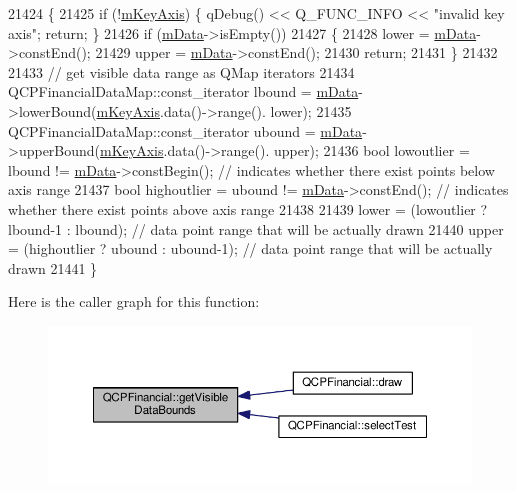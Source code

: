 \begin{DoxyCode}
21424 \{
21425   \textcolor{keywordflow}{if} (!\hyperlink{class_q_c_p_abstract_plottable_a426f42e254d0f8ce5436a868c61a6827}{mKeyAxis}) \{ qDebug() << Q\_FUNC\_INFO << \textcolor{stringliteral}{"invalid key axis"}; \textcolor{keywordflow}{return}; \}
21426   \textcolor{keywordflow}{if} (\hyperlink{class_q_c_p_financial_a475f63587ca1077d8c30aaf2b71ae026}{mData}->isEmpty())
21427   \{
21428     lower = \hyperlink{class_q_c_p_financial_a475f63587ca1077d8c30aaf2b71ae026}{mData}->constEnd();
21429     upper = \hyperlink{class_q_c_p_financial_a475f63587ca1077d8c30aaf2b71ae026}{mData}->constEnd();
21430     \textcolor{keywordflow}{return};
21431   \}
21432   
21433   \textcolor{comment}{// get visible data range as QMap iterators}
21434   QCPFinancialDataMap::const\_iterator lbound = \hyperlink{class_q_c_p_financial_a475f63587ca1077d8c30aaf2b71ae026}{mData}->lowerBound(\hyperlink{class_q_c_p_abstract_plottable_a426f42e254d0f8ce5436a868c61a6827}{mKeyAxis}.data()->range().
      lower);
21435   QCPFinancialDataMap::const\_iterator ubound = \hyperlink{class_q_c_p_financial_a475f63587ca1077d8c30aaf2b71ae026}{mData}->upperBound(\hyperlink{class_q_c_p_abstract_plottable_a426f42e254d0f8ce5436a868c61a6827}{mKeyAxis}.data()->range().
      upper);
21436   \textcolor{keywordtype}{bool} lowoutlier = lbound != \hyperlink{class_q_c_p_financial_a475f63587ca1077d8c30aaf2b71ae026}{mData}->constBegin(); \textcolor{comment}{// indicates whether there exist points below axis
       range}
21437   \textcolor{keywordtype}{bool} highoutlier = ubound != \hyperlink{class_q_c_p_financial_a475f63587ca1077d8c30aaf2b71ae026}{mData}->constEnd(); \textcolor{comment}{// indicates whether there exist points above axis
       range}
21438   
21439   lower = (lowoutlier ? lbound-1 : lbound); \textcolor{comment}{// data point range that will be actually drawn}
21440   upper = (highoutlier ? ubound : ubound-1); \textcolor{comment}{// data point range that will be actually drawn}
21441 \}
\end{DoxyCode}


Here is the caller graph for this function\+:\nopagebreak
\begin{figure}[H]
\begin{center}
\leavevmode
\includegraphics[width=350pt]{class_q_c_p_financial_aca2edf9f19fae733cdb6bd4549019b84_icgraph}
\end{center}
\end{figure}



